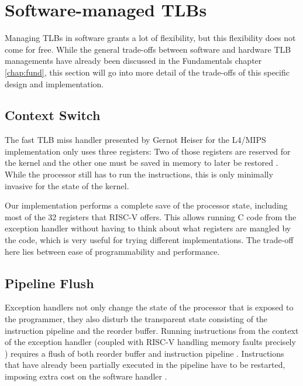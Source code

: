 \section{Software-managed TLBs}
Managing TLBs in software grants a lot of flexibility, but this flexibility does not come
for free. While the general trade-offs between software and hardware TLB managements have
already been discussed in the Fundamentals chapter \ref{chap:fund}, this section will
go into more detail of the trade-offs of this specific design and implementation.

\subsection{Context Switch} The fast TLB miss handler presented by Gernot Heiser for the
L4/MIPS implementation only uses three registers: Two of those registers are reserved
for the kernel and the other one must be saved in memory to later be restored \cite{heiserAnatomyHighPerformanceMicrokernel}.
While the processor still has to run the instructions, this is only minimally invasive
for the state of the kernel.

Our implementation performs a complete save of the processor state, including most of the
32 registers that RISC-V offers.
This allows running C code from the exception handler without having to think about what
registers are mangled by the code, which is very useful for trying different implementations.
The trade-off here lies between ease of programmability and performance.

\subsection{Pipeline Flush} Exception handlers not only change the state of the processor that is
exposed to the programmer, they also disturb the transparent state consisting of the
instruction pipeline and the reorder buffer.
Running instructions from the context of the exception handler (coupled with RISC-V handling
memory faults precisely \cite{RISCVInstructionSet}) requires a flush of both reorder buffer
and instruction pipeline \cite{jacobVirtualMemoryContemporary1998}.
Instructions that have already been partially executed in the pipeline have to be restarted,
imposing extra cost on the software handler \cite{jacob1998look}.

